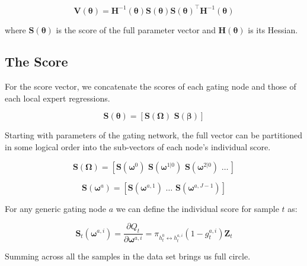 \documentclass[12pt]{article}
\newcommand{\HH}[1]{\boldsymbol{H}(#1)}
\newcommand{\HI}[1]{\boldsymbol{H}^{-1}(#1)}
\newcommand{\gateprod}[2]{\pi_{#1 \longleftrightarrow #2}}
\begin{document}
\begin{equation} \label{eq:robustgatevarcov}
  \boldsymbol{V}(\boldsymbol{\theta}) = \HI{\boldsymbol{\theta}} \boldsymbol{S}(\boldsymbol{\theta}) \boldsymbol{S}(\boldsymbol{\theta})^\top \HI{\boldsymbol{\theta}}
\end{equation}

where $\boldsymbol{S}(\boldsymbol{\theta})$ is the score of the full parameter 
vector and $\HH{\boldsymbol{\theta}}$ is its Hessian.

\subsection{The Score}

For the score vector, we concatenate the scores of each gating node and those of each
local expert regressions.

\begin{equation}
  \boldsymbol{S}(\boldsymbol{\theta}) = [ \boldsymbol{S}(\boldsymbol{\Omega}) \,\, \boldsymbol{S}(\boldsymbol{\beta}) ]
\end{equation}

Starting with parameters of the gating network, the full vector can be partitioned 
in some logical order into the sub-vectors of each node's individual
score.

\begin{equation}
  \boldsymbol{S}(\boldsymbol{\Omega}) = [ \boldsymbol{S}(\boldsymbol{\omega}^{0}) \,\, \boldsymbol{S}(\boldsymbol{\omega}^{1 | 0}) \,\, \boldsymbol{S}(\boldsymbol{\omega}^{2 | 0}) \,\, \ldots \, ]
\end{equation}

\begin{equation}
  \boldsymbol{S}(\boldsymbol{\omega}^{a}) = [ \boldsymbol{S}(\boldsymbol{\omega}^{a, 1}) \,\, \ldots \,\, \boldsymbol{S}(\boldsymbol{\omega}^{a, J - 1}) ]
\end{equation}

For any generic gating node $a$ we can define the individual score for 
sample $t$ as:

\begin{equation} \label{eq:gateScore}
  \boldsymbol{S}_{t}(\boldsymbol{\omega}^{a, i}) = \frac{\partial Q_{t}}{\partial \boldsymbol{\omega}^{a,i}} = \gateprod{h^{0}_{t}}{h^{a,i}_{t}} (1 - g^{a, i}_{t}) \boldsymbol{Z}_{t} 
\end{equation}


Summing across all the samples in the data set brings us full circle.
\end{document}
